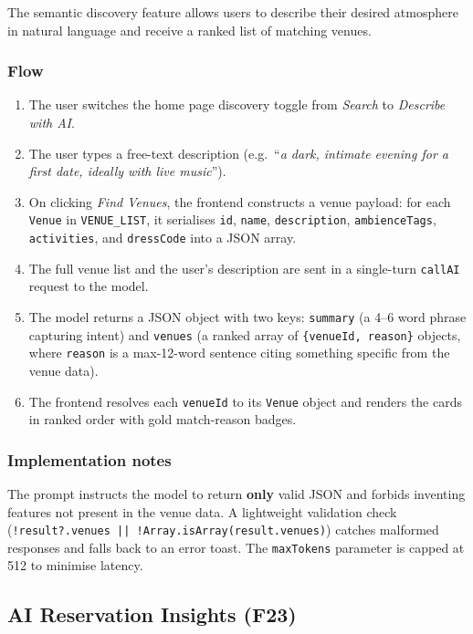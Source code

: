 \documentclass[12pt,a4paper,oneside]{report}
\begin{document}
The semantic discovery feature allows users to describe their desired atmosphere
in natural language and receive a ranked list of matching venues.

\subsubsection{Flow}
\begin{enumerate}[leftmargin=2em, topsep=4pt, itemsep=2pt]
  \item The user switches the home page discovery toggle from
        \emph{Search} to \emph{Describe with AI}.
  \item The user types a free-text description (e.g.\ ``\textit{a dark,
        intimate evening for a first date, ideally with live music}'').
  \item On clicking \emph{Find Venues}, the frontend constructs a venue
        payload: for each \texttt{Venue} in \texttt{VENUE\_LIST}, it
        serialises \texttt{id}, \texttt{name}, \texttt{description},
        \texttt{ambienceTags}, \texttt{activities}, and
        \texttt{dressCode} into a JSON array.
  \item The full venue list and the user's description are sent in a
        single-turn \texttt{callAI} request to the model.
  \item The model returns a JSON object with two keys:
        \texttt{summary} (a 4--6 word phrase capturing intent) and
        \texttt{venues} (a ranked array of \texttt{\{venueId, reason\}}
        objects, where \texttt{reason} is a max-12-word sentence citing
        something specific from the venue data).
  \item The frontend resolves each \texttt{venueId} to its
        \texttt{Venue} object and renders the cards in ranked order with
        gold match-reason badges.
\end{enumerate}

\subsubsection{Implementation notes}
The prompt instructs the model to return \textbf{only} valid JSON and
forbids inventing features not present in the venue data. A lightweight
validation check (\texttt{!result?.venues || !Array.isArray(result.venues)})
catches malformed responses and falls back to an error toast. The
\texttt{maxTokens} parameter is capped at 512 to minimise latency.

\subsection{AI Reservation Insights (F23)}
\end{document}
